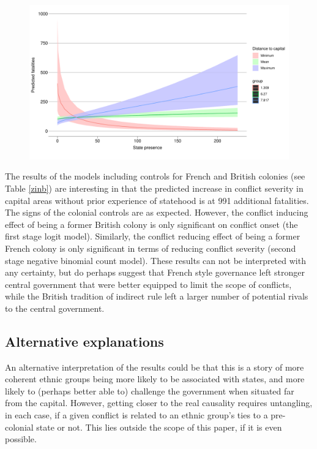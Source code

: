 \documentclass[12pt]{article}
\begin{document}
\begin{figure}[htpb]
	\centering
	\includegraphics[width=\linewidth]{"../R/Output/zinbplot.pdf"}
	\caption{}
	\label{deaths_zinb}
\end{figure}


The results of the models including controls for French and British colonies
(see Table \ref{zinb}) are interesting in that the predicted increase in conflict
severity in capital areas without prior experience of statehood is at 991
additional fatalities. The signs of the colonial controls are as
expected. However, the conflict inducing effect of being a former British
colony is only significant on conflict onset (the first stage logit
model). Similarly, the conflict reducing effect of being a former French colony
is only significant in terms of reducing conflict severity (second stage
negative binomial count model). These results can not be interpreted with any
certainty, but do perhaps suggest that French style governance left stronger
central government that were better equipped to limit the scope of conflicts,
while the British tradition of indirect rule left a larger number of potential
rivals to the central government.

\subsection{Alternative explanations}

An alternative interpretation of the results could be that this is a
story of more coherent ethnic groups being more likely to be associated with
states, and more likely to (perhaps better able to) challenge the government
when situated far from the capital. However, getting closer to the real
causality requires untangling, in each case, if a given conflict is related to
an ethnic group's ties to a pre-colonial state or not. This lies outside the
scope of this paper, if it is even possible.
\end{document}
